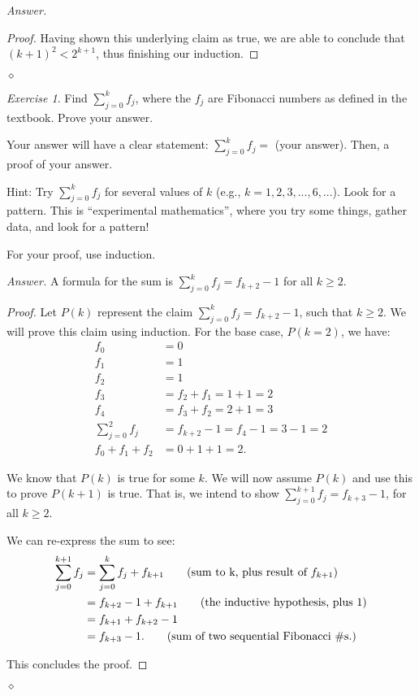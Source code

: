 \documentclass[12pt,oneside]{amsart}
\theoremstyle{remark}
\newtheorem{exer}{Exercise}
\newenvironment{answer}{\bigskip\noindent\emph{Answer.}}{\hfill$\diamond$\newline}
\begin{document}
\begin{answer}
\begin{proof}
Having shown this underlying claim as true, we are able to conclude that $(k + 1)^2 < 2^{k + 1}$, thus finishing our induction. %
\end{proof}

\end{answer}

%
%
%
%

\newpage
\begin{exer}
Find $\sum_{j = 0}^k f_j$, where the $f_j$ are Fibonacci numbers as defined in the textbook. Prove your answer.

Your answer will have a clear statement: $\sum_{j = 0}^k f_j =$ (your answer). Then, a proof of your answer.

Hint: Try $\sum_{j = 0}^k f_j$ for several values of $k$ (e.g., $k = 1, 2, 3, ..., 6, ...$). Look for a pattern. This is “experimental mathematics”, where you try some things, gather data, and look for a pattern!

For your proof, use induction.
\end{exer}

\begin{answer}
A formula for the sum is $\sum_{j = 0}^k f_j = f_{k + 2} - 1$ for all $k \geq 2$.
\begin{proof}
Let $P(k)$ represent the claim $\sum_{j = 0}^k f_j = f_{k + 2} - 1$, such that $k \geq 2$. We will prove this claim using induction. For the base case, $P(k = 2)$, we have:
\begin{align*}
                    f_0 &= 0 \\
                    f_1 &= 1 \\
                    f_2 &= 1 \\
f_3 &= f_2 + f_1 = 1 + 1 = 2 \\
f_4 &= f_3 + f_2 = 2 + 1 = 3 \\
\sum_{j = 0}^{2} f_j &= f_{k + 2} - 1 = f_4 - 1 = 3 - 1 = 2 \\
f_0 + f_1 + f_2 &= 0 + 1 + 1 = 2.
\end{align*}

We know that $P(k)$ is true for some $k$. We will now assume $P(k)$ and use this to prove $P(k + 1)$ is true. That is, we intend to show $\sum_{j = 0}^{k + 1} f_j = f_{k + 3} - 1$, for all $k \geq 2$.

We can re-express the sum to see:
\begin{align*}
\sum_{j = 0}^{k + 1} f_j &= \sum_{j = 0}^{k} f_j + f_{k + 1} \tag{sum to k, plus result of $f_{k+1}$} \\
                         &= f_{k + 2} - 1 + f_{k + 1} \tag{the inductive hypothesis, plus 1} \\
                         &= f_{k + 1} + f_{k + 2} - 1 \\
                         &= f_{k + 3} - 1. \tag{sum of two sequential Fibonacci \#s.}
\end{align*}

This concludes the proof.

\end{proof}
\end{answer}
\end{document}
